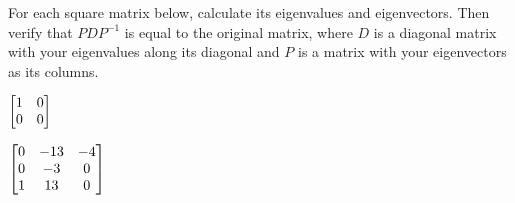 \documentclass[oneperpage]{gsypset}
\begin{document}
	\begin{problem*}
		For each square matrix below, calculate its eigenvalues and eigenvectors.
		Then verify that $PDP^{-1}$ is equal to the original matrix, 
		where $D$ is a diagonal matrix with your eigenvalues along its diagonal
		and $P$ is a matrix with your eigenvectors as its columns.
		\begin{subproblems}[(a)]
			\subproblem $\begin{bmatrix}1&0\\0&0\end{bmatrix}$
			\begin{solution}
				
			\end{solution}
			
			\subproblem $\begin{bmatrix}0 & -13 & -4 \\ 0 & -3 & 0 \\ 1 & 13 & 0\end{bmatrix}$
			\begin{solution}
				
			\end{solution}
		\end{subproblems}
	\end{problem*}
\end{document}
